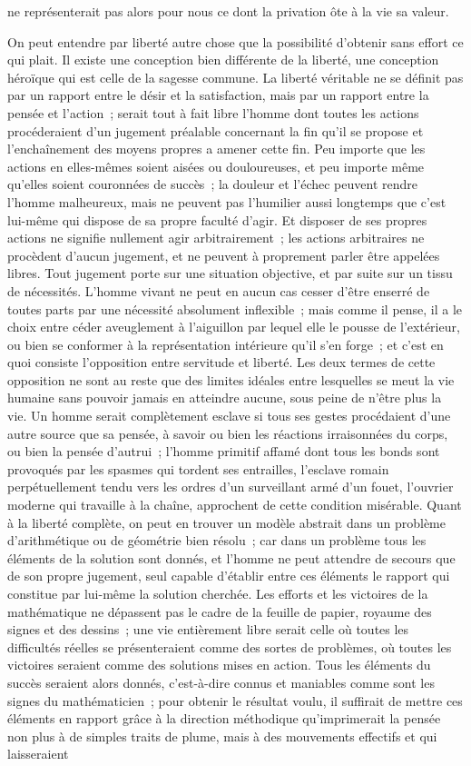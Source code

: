 \documentclass[french,twoside]{book} %
\begin{document}
ne représenterait pas alors pour nous ce dont la privation ôte à la vie sa valeur.\par
On peut entendre par liberté autre chose que la possibilité d'obtenir sans effort ce qui plait. Il existe une conception bien différente de la liberté, une conception héroïque qui est celle de la sagesse commune. La liberté véritable ne se définit pas par un rapport entre le désir et la satisfaction, mais par un rapport entre la pensée et l'action ; serait tout à fait libre l'homme dont toutes les actions procéderaient d'un jugement préalable concernant la fin qu'il se propose et l’enchaînement des moyens propres a amener cette fin. Peu importe que les actions en elles-mêmes soient aisées ou douloureuses, et peu importe même qu'elles soient couronnées de succès ; la douleur et l'échec peuvent rendre l'homme malheureux, mais ne peuvent pas l'humilier aussi longtemps que c'est lui-même qui dispose de sa propre faculté d'agir. Et disposer de ses propres actions ne signifie nullement agir arbitrairement ; les actions arbitraires ne procèdent d'aucun jugement, et ne peuvent à proprement parler être appelées libres. Tout jugement porte sur une situation objective, et par suite sur un tissu de nécessités. L'homme vivant ne peut en aucun cas cesser d'être enserré de toutes parts par une nécessité absolument inflexible ; mais comme il pense, il a le choix entre céder aveuglement à l'aiguillon par lequel elle le pousse de l'extérieur, ou bien se conformer à la représentation intérieure qu'il s'en forge ; et c'est en quoi consiste l'opposition entre servitude et liberté. Les deux termes de cette opposition ne sont au reste que des limites idéales entre lesquelles se meut la vie humaine sans pouvoir jamais en atteindre aucune, sous peine de n'être plus la vie. Un homme serait complètement esclave si tous ses gestes procédaient d'une autre source que sa pensée, à savoir ou bien les réactions irraisonnées du corps, ou bien la pensée d'autrui ; l'homme primitif affamé dont tous les bonds sont provoqués par les spasmes qui tordent ses entrailles, l'esclave romain perpétuellement tendu vers les ordres d'un surveillant armé d'un fouet, l'ouvrier moderne qui travaille à la chaîne, approchent de cette condition misérable. Quant à la liberté complète, on peut en trouver un modèle abstrait dans un problème d'arithmétique ou de géométrie bien résolu ; car dans un problème tous les éléments de la solution sont donnés, et l'homme ne peut attendre de secours que de son propre jugement, seul capable d'établir entre ces éléments le rapport qui constitue par lui-même la solution cherchée. Les efforts et les victoires de la mathématique ne dépassent pas le cadre de la feuille de papier, royaume des signes et des dessins ; une vie entièrement libre serait celle où toutes les difficultés réelles se présenteraient comme des sortes de problèmes, où toutes les victoires seraient comme des solutions mises en action. Tous les éléments du succès seraient alors donnés, c'est-à-dire connus et maniables comme sont les signes du mathématicien ; pour obtenir le résultat voulu, il suffirait de mettre ces éléments en rapport grâce à la direction méthodique qu'imprimerait la pensée non plus à de simples traits de plume, mais à des mouvements effectifs et qui laisseraient 
\end{document}
